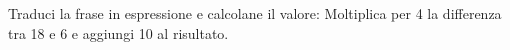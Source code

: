 \item Traduci la frase in espressione e calcolane il valore: Moltiplica per 4 la differenza tra 18 e 6 e aggiungi 10 al risultato.